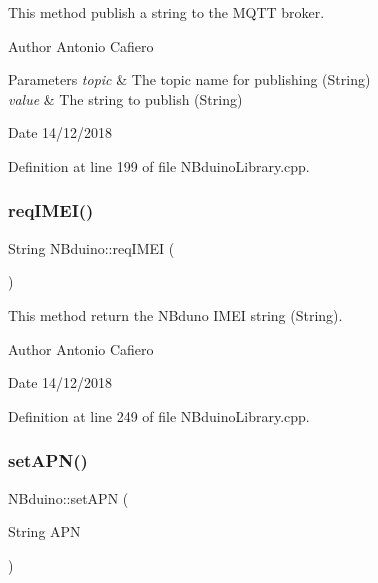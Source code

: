 This method publish a string to the M\+Q\+TT broker. \begin{DoxyAuthor}{Author}
Antonio Cafiero 
\end{DoxyAuthor}

\begin{DoxyParams}{Parameters}
{\em topic} & The topic name for publishing (String) \\
\hline
{\em value} & The string to publish (String) \\
\hline
\end{DoxyParams}
\begin{DoxyDate}{Date}
14/12/2018 
\end{DoxyDate}


Definition at line 199 of file N\+Bduino\+Library.\+cpp.

\mbox{\label{class_n_bduino_a3d96fbfb52c89cd55e9a7a3f387c6945}} 
\subsubsection{\texorpdfstring{req\+I\+M\+E\+I()}{reqIMEI()}}
{\footnotesize\ttfamily String N\+Bduino\+::req\+I\+M\+EI (\begin{DoxyParamCaption}{ }\end{DoxyParamCaption})}

This method return the N\+Bduno I\+M\+EI string (String). \begin{DoxyAuthor}{Author}
Antonio Cafiero 
\end{DoxyAuthor}
\begin{DoxyDate}{Date}
14/12/2018 
\end{DoxyDate}


Definition at line 249 of file N\+Bduino\+Library.\+cpp.

\mbox{\label{class_n_bduino_a9a903295305e847b3d68a7a6cc111316}} 
\subsubsection{\texorpdfstring{set\+A\+P\+N()}{setAPN()}}
{\footnotesize\ttfamily N\+Bduino\+::set\+A\+PN (\begin{DoxyParamCaption}\item[{String}]{A\+PN }\end{DoxyParamCaption})}

